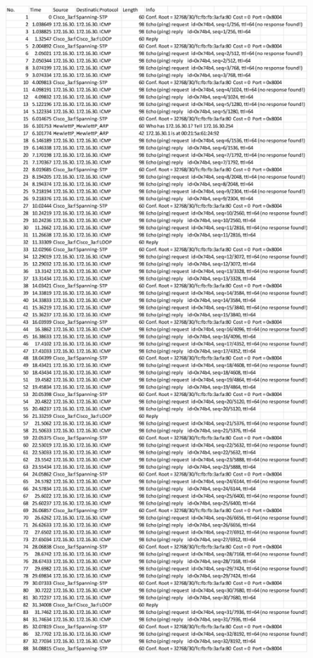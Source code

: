 \documentclass[a4paper,11pt,english]{article}
\begin{document}
        \begin{figure}[H]
            \centering
            \includegraphics[scale=0.6]{./imgs/exp2-tux33-step73.png}
        \end{figure}
        
\end{document}
